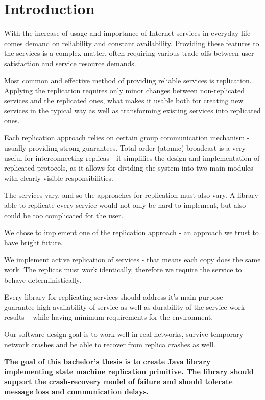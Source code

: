 
\chapter{Introduction}

With the increase of usage and importance of Internet services in everyday life comes demand on reliability and constant availability.
Providing these features to the services is a complex matter, often requiring various trade-offs between user satisfaction and service resource demands.

Most common and effective method of providing reliable services is replication. Applying the replication requires only minor changes between non-replicated services and the replicated ones, what makes it usable both for creating new services in the typical way %
as well as transforming existing services into replicated ones.

Each replication approach relies on certain group communication mechanism - usually providing strong guarantees. Total-order (atomic) broadcast is a very useful for interconnecting replicas - it simplifies the design and implementation of replicated protocols, as it allows for dividing the system into two main modules with clearly visible responsibilities.

The services vary, and so the approaches for replication must also vary. A library able to replicate every service would not only be hard to implement, but also could be too complicated for the user.

We chose to implement one of the replication approach - an approach we trust to have bright future.

We implement active replication of services - that means each copy does the same work. The replicas must work identically, therefore we require the service to behave deterministically.

Every library for replicating services should address it's main purpose -- guarantee high availability of service as well as durability of the service work results -- while having minimum requirements for the environment.

Our software design goal is to work well in real networks, survive temporary network crashes and be able to recover from replica crashes as well.

{
\bfseries
The goal of this bachelor's thesis is to create Java library implementing state machine replication primitive. The library should support the crash-recovery model of failure and should tolerate message loss and communication delays.
}

